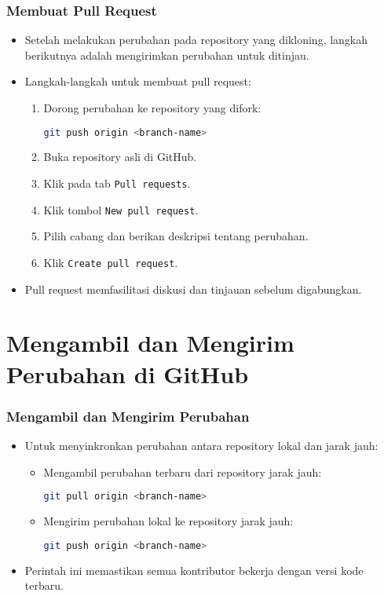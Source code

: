 \documentclass[aspectratio=169, table]{beamer}
\begin{document}
\begin{frame}[fragile]
	\frametitle{Membuat Pull Request}
	\vspace{20pt}
	\begin{itemize}
		\item Setelah melakukan perubahan pada repository yang dikloning, langkah berikutnya adalah mengirimkan perubahan untuk ditinjau.
		\item Langkah-langkah untuk membuat pull request:
		\begin{enumerate}
			\item Dorong perubahan ke repository yang difork:
			\begin{lstlisting}[language=bash]
				git push origin <branch-name>
			\end{lstlisting}
			\item Buka repository asli di GitHub.
			\item Klik pada tab \texttt{Pull requests}.
			\item Klik tombol \texttt{New pull request}.
			\item Pilih cabang dan berikan deskripsi tentang perubahan.
			\item Klik \texttt{Create pull request}.
		\end{enumerate}
		\item Pull request memfasilitasi diskusi dan tinjauan sebelum digabungkan.
	\end{itemize}
\end{frame}

\section{Mengambil dan Mengirim Perubahan di GitHub}

\begin{frame}[fragile]
	\frametitle{Mengambil dan Mengirim Perubahan}
	\begin{itemize}
		\item Untuk menyinkronkan perubahan antara repository lokal dan jarak jauh:
		\begin{itemize}
			\item Mengambil perubahan terbaru dari repository jarak jauh:
			\begin{lstlisting}[language=bash]
				git pull origin <branch-name>
			\end{lstlisting}
			\item Mengirim perubahan lokal ke repository jarak jauh:
			\begin{lstlisting}[language=bash]
				git push origin <branch-name>
			\end{lstlisting}
		\end{itemize}
		\item Perintah ini memastikan semua kontributor bekerja dengan versi kode terbaru.
	\end{itemize}
\end{frame}
\end{document}
